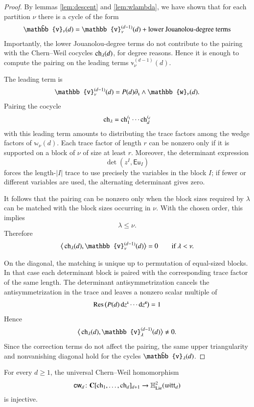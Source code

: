 \documentclass[main.tex]{subfiles}
\begin{document}
\begin{proof}
  By lemmas \ref{lem:descent} and \ref{lem:wlambda}, we have shown that for each partition $\nu$ there is a cycle of the form
  \[
    \til{\mathbb{v}}_\nu(d)
    =
    \mathbb{v}^{(d-1)}_\nu(d)+\text{lower Jouanolou-degree terms}
  \]
  Importantly, the lower Jouanolou-degree terms do not contribute to the pairing with the Chern--Weil cocycles
  $\operatorname{ch}_\lambda(d)$, for degree reasons. Hence it is enough to compute the
  pairing on the leading terms $\mathbb{v}^{(d-1)}_\nu(d)$.

  The leading term is
  \[
    \mathbb{v}^{(d-1)}_\nu(d)
    =
    P(d)\del_\1\wedge \mathbb{w}_\nu(d).
  \]
  Pairing the cocycle
  \[
    \operatorname{ch}_\lambda
    =
    \operatorname{ch}_1^{i_1}\cdots \operatorname{ch}_d^{i_d}
  \]
  with this leading term amounts to distributing the trace factors among the wedge
  factors of $\mathbb{w}_\nu(d)$. 
  Each trace factor of length $r$ can be
  nonzero only if it is supported on a block of $\nu$ of size at least $r$.
  Moreover, the determinant expression
  \[
    \det(z^I,\mathsf{Eu}_I)
  \]
  forces the length-$|I|$ trace to use precisely the variables in the block
  $I$; if fewer or different variables are used, the alternating determinant
  gives zero.

  It follows that the pairing can be nonzero only when the block sizes required
  by $\lambda$ can be matched with the block sizes occurring in $\nu$. With the
  chosen order, this implies
  \[
    \lambda\leq \nu .
  \]
  Therefore
  \[
    \big\langle \op{ch}_{\lambda}(d),
    \mathbb{v}^{(d-1)}_{\nu}(d)
    \big\rangle=0
    \qquad \text{if } \lambda<\nu .
  \]

  On the diagonal, the matching is unique up to permutation of equal-sized
  blocks. In that case each determinant block is paired with the corresponding
  trace factor of the same length. The determinant antisymmetrization cancels
  the antisymmetrization in the trace and leaves a nonzero scalar multiple of
  \[
    \operatorname{Res}\big(P(d)\,\mathrm{d} z^{\textbf{\texttt{\tiny{1}}}}\cdots \mathrm{d} z^{\textbf{\texttt{\tiny{d}}}}\big) = 1
  \]
  Hence
  \[
    \big\langle \op{ch}_{\lambda}(d),
    \mathbb{v}^{(d-1)}_{\lambda}(d)
    \big\rangle\neq 0 .
  \]
  Since the correction terms do not affect the pairing, the same upper
  triangularity and nonvanishing diagonal hold for the cycles
  $\til{\mathbb{v}}_\lambda(d)$.
\end{proof}

\begin{theorem}\label{thm:cwd-injective}
  For every $d\geq 1$, the universal Chern--Weil homomorphism
  \[
    \mathsf{cw}_d\colon
    \mathbf{C}[\operatorname{ch}_1,\ldots,\operatorname{ch}_d]_{d+1}
    \to
    \mathbb H^2_{\operatorname{Lie}}(\mathfrak{witt}_d)
  \]
  is injective.
\end{theorem}
\end{document}
